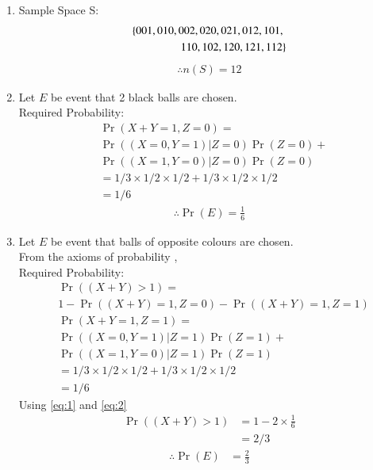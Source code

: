 \documentclass[journal,12pt,twocolumn]{IEEEtran}
\providecommand{\pr}[1]{\ensuremath{\Pr\left(#1\right)}}
\begin{document}
 
\begin{enumerate}[label =(\alph*)]
\item Sample Space S:
\begin{align}
\left\{001,010,002,020,021,012,101,\right.\\
 \left.110,102,120,121,112\right\} 
\end{align} 
\begin{align}
    \therefore n(S) = 12
\end{align}
\item Let $E$ be event that 2 black balls are chosen.\\
Required Probability:
\begin{align}  \label{eq:1}
&\pr{X+Y=1,Z=0} =\\ \nonumber
&\pr{ (X =0,Y=1) | Z=0}\pr{Z=0} +\\ \nonumber
&\pr{  (X =1,Y=0) | Z=0}\pr{Z=0}\\ 
&= 1/3\times1/2\times1/2 + 1/3\times1/2\times1/2\\ 
&= 1/6 
\end{align}
\begin{align}
\therefore \pr{E} = \frac{1}{6} 
\end{align}
\item Let $E$ be event that balls of opposite colours are chosen.\\
From the axioms of probability ,\\
Required Probability:
\begin{align}
&\pr{(X+Y)>1} =\\ \nonumber
&1-\pr{(X+Y)=1,Z =0} -\pr{(X+Y)=1,Z=1}  \\ \label{eq:2}
&\pr{X+Y=1,Z=1} =\\ \nonumber
&\pr{ (X =0,Y=1) | Z=1}\pr{Z=1} +\\ \nonumber
&\pr{  (X =1,Y=0) | Z=1}\pr{Z=1}\\ 
&= 1/3\times1/2\times1/2 + 1/3\times1/2\times1/2\\ 
&= 1/6  
\end{align}
Using \eqref{eq:1} and \eqref{eq:2}
\begin{align}
\pr{(X+Y)>1} &=1-2\times\frac{1}{6}\\
&=2/3
\end{align}
\begin{align}
\therefore \pr{E} &= \frac{2}{3}
\end{align}
\end{enumerate}
\end{document}
